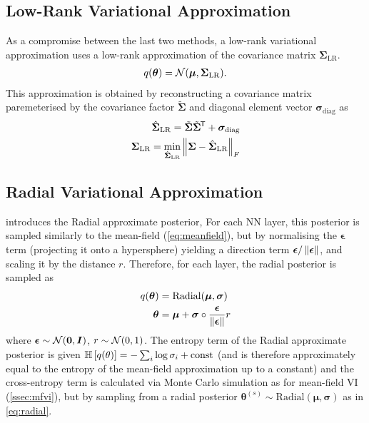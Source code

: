 \subsection{Low-Rank Variational Approximation}

As a compromise between the last two methods, a low-rank variational approximation uses a low-rank approximation of the covariance matrix \(\bm \Sigma_{\mathrm{LR}}\).
\begin{align}\label{eq:lowrank}
    q(\bm \theta) = \mathcal{N}(\bm \mu, \bm \Sigma_{\mathrm{LR}}).
\end{align}
This approximation is obtained by reconstructing a covariance matrix paremeterised by the covariance factor \(\tilde{\bm \Sigma}\) and diagonal element vector \(\bm \sigma_{\text{diag}}\) as
\begin{align}
    \hat{\bm \Sigma}_{\text{LR}} = \tilde{\bm \Sigma} \tilde{\bm \Sigma}^{\mkern-1.5mu\mathsf{T}} + \bm \sigma_{\text{diag}} \nonumber \\
    \bm \Sigma_{\text{LR}} = \min_{\hat{\bm \Sigma}_{\text{LR}}} \left\lVert\bm \Sigma - \hat{\bm \Sigma}_{\text{LR}}\right\rVert_F \label{eq:lowrank-covariance}
\end{align}

\subsection{Radial Variational Approximation}

\textcite{farquhar2020radial} introduces the Radial approximate posterior,
For each NN layer, this posterior is sampled similarly to the mean-field (\cref{eq:meanfield}), but by normalising the \(\bm{\epsilon}\) term (projecting it onto a hypersphere) yielding a direction term \(\bm{\epsilon}/\left\lVert\bm{\epsilon}\right\rVert\), and scaling it by the distance \(r\).
Therefore, for each layer, the radial posterior is sampled as
\begin{align}\label{eq:radial}
    q(\bm \theta) ={} & \mathrm{Radial}(\bm{\mu}, \bm{\sigma}) \nonumber                          \\
    \bm{\theta} ={}   & \bm{\mu} + \bm{\sigma} \circ \frac{\bm{\epsilon}}{\left\lVert\bm{\epsilon}\right\rVert} r
\end{align}
where \(\bm{\epsilon} \sim \mathcal{N}(\bm{0}, \bm{I})\), \(r \sim \mathcal{N}(0, 1)\).
The entropy term of the Radial approximate posterior is given
\(\mathbb{H}\left[q(\theta)\right] = - \sum_i \log \sigma_i + \mathrm{const}\) (and is therefore approximately equal to the entropy of the mean-field approximation up to a constant) and the cross-entropy term is calculated via Monte Carlo simulation as for mean-field VI (\cref{ssec:mfvi}), but by sampling from a radial posterior \(\bm{\theta}^{(s)} \sim \mathrm{Radial}(\bm{\mu}, \bm{\sigma})\) as in \cref{eq:radial}.

